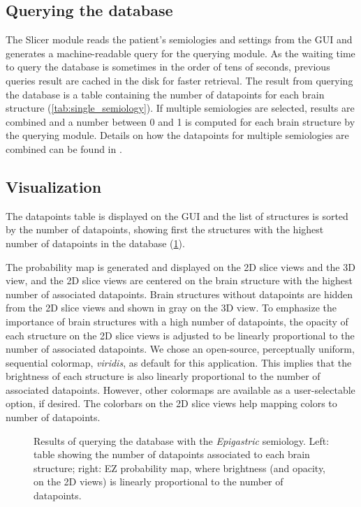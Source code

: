 \subsection{Querying the database}
\label{sec:svt_querying}

The Slicer module reads the patient's semiologies and settings from the \ac{GUI} and generates a machine-readable query for the querying module.
As the waiting time to query the database is sometimes in the order of tens of seconds, previous queries result are cached in the disk for faster retrieval.
The result from querying the database is a table containing the number of datapoints for each brain structure (\cref{tab:single_semiology}).
If multiple semiologies are selected, results are combined and a number between 0 and 1 is computed for each brain structure by the querying module.
Details on how the datapoints for multiple semiologies are combined can be found in \cite{alim-marvasti_mapping_2021}.


\subsection{Visualization}
\label{sec:svt_visualization}

The datapoints table is displayed on the \ac{GUI} and the list of structures is sorted by the number of datapoints, showing first the structures with the highest number of datapoints in the database (\cref{fig:svt_query}).

The probability map is generated and displayed on the 2D slice views and the 3D view, and the 2D slice views are centered on the brain structure with the highest number of associated datapoints.
Brain structures without datapoints are hidden from the 2D slice views and shown in gray on the 3D view.
To emphasize the importance of brain structures with a high number of datapoints, the opacity of each structure on the 2D slice views is adjusted to be linearly proportional to the number of associated datapoints.
We chose an open-source, perceptually uniform, sequential colormap, \textit{viridis}, as default for this application.
This implies that the brightness of each structure is also linearly proportional to the number of associated datapoints.
However, other colormaps are available as a user-selectable option, if desired.
The colorbars on the 2D slice views help mapping colors to number of datapoints.

\begin{figure}
  \centering
  \caption[Results of querying the database with the \textit{Epigastric} semiology]{
    Results of querying the database with the \textit{Epigastric} semiology.
    Left: table showing the number of datapoints associated to each brain structure;
    right: \ac{EZ} probability map, where brightness (and opacity, on the 2D views) is linearly proportional to the number of datapoints.
  }
  \label{fig:svt_query}
\end{figure}


